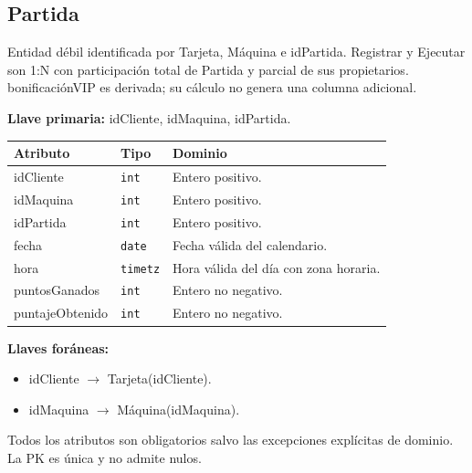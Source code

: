 \par\noindent\begin{minipage}{\textwidth}
\subsection{Partida}
Entidad débil identificada por Tarjeta, Máquina e idPartida. Registrar y Ejecutar son 1:N con participación total de Partida y parcial de sus propietarios. bonificaciónVIP es derivada; su cálculo no genera una columna adicional.\par
\textbf{Llave primaria:} idCliente, idMaquina, idPartida.\par
{\small\begin{tabular}{@{}p{}p{}p{}@{}}
\toprule Atributo & Tipo & Dominio \\ \midrule
idCliente & \texttt{int} & Entero positivo. \\
idMaquina & \texttt{int} & Entero positivo. \\
idPartida & \texttt{int} & Entero positivo. \\
fecha & \texttt{date} & Fecha válida del calendario. \\
hora & \texttt{timetz} & Hora válida del día con zona horaria. \\
puntosGanados & \texttt{int} & Entero no negativo. \\
puntajeObtenido & \texttt{int} & Entero no negativo. \\
\bottomrule\end{tabular}}
\textbf{Llaves foráneas:}\begin{itemize}[nosep]
\item idCliente $\rightarrow$ Tarjeta(idCliente).
\item idMaquina $\rightarrow$ Máquina(idMaquina).
\end{itemize}
Todos los atributos son obligatorios salvo las excepciones explícitas de dominio. La PK es única y no admite nulos.
\end{minipage}\par\vspace{.35cm}